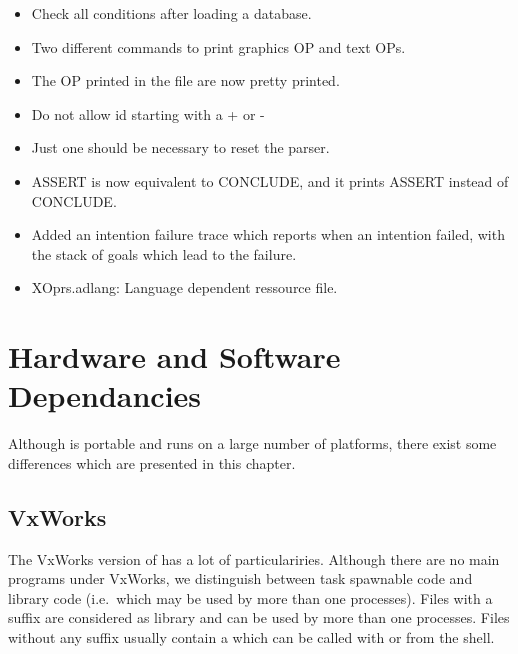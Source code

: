 \begin{itemize}
\item Check all conditions after loading a database.

\item Two different commands to print graphics OP and text OPs.

\item The OP printed in the file are now pretty printed.

\item Do not allow id starting with a + or -

\item Just one  should be necessary to reset the \OPRSS{} parser.

\item ASSERT is now equivalent to CONCLUDE, and it prints ASSERT instead of
CONCLUDE.

\item Added an intention failure trace which reports when
an intention failed, with the stack of goals which lead to the
failure.

\item XOprs.adlang: Language dependent ressource file.

\end{itemize}

\chapter{Hardware and Software Dependancies}

Although \COPRS{} is portable and runs on a large number of platforms, there
exist some differences which are presented in this chapter.



\section{VxWorks}

The VxWorks version of \COPRS{} has a lot of particulariries. Although there are
no main programs under VxWorks, we distinguish between task spawnable code and
library code (i.e.\ which may be used by more than one processes). Files with a
 suffix are considered as library and can be used by more than one
processes. Files without any suffix usually contain a  which can be
called with  or from the shell.

